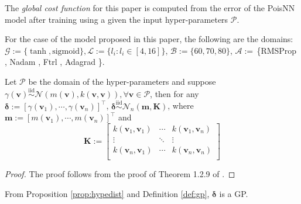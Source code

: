 \begin{remark}
    The \textit{global cost function} for this paper is computed from the error of the PoisNN model after training using a given the input hyper-parameters $\mathscr{P}$.
\end{remark}
\begin{remark}
    For the case of the model proposed in this paper, the following are the domains: $\mathscr{G}:=\{\tanh,\mathrm{sigmoid}\},\mathscr{L}:=\{l_i: l_i\in [4, 16]\}$, $\mathscr{B}:=\{60, 70, 80\}$, $\mathscr{A}:=$\,\{RMSProp \cite{hinton2012}, Nadam \cite{Dozat2016IncorporatingNM}, Ftrl \cite{ftrl}, Adagrad \cite{JMLR:adagrad}\}.
\end{remark}
\begin{prop}\label{prop:hypedist}
    Let $\mathscr{P}$ be the domain of the hyper-parameters and suppose $\gamma(\mathbf{v})\overset{\mathrm{iid}}{\sim}\mathcal{N}(m(\mathbf{v}),k(\mathbf{v},\mathbf{v})), \forall \mathbf{v}\in\mathscr{P}$, then for any $\boldsymbol{\delta}:=[\gamma(\mathbf{v}_1),\cdots,\gamma(\mathbf{v}_n)]^{\top}$, $\boldsymbol{\delta}\overset{\mathrm{iid}}{\sim}\mathcal{N}_n(\mathbf{m},\mathbf{K})$, where $\mathbf{m}:=[m(\mathbf{v}_1),\cdots,m(\mathbf{v}_n)]^{\top}$ and
    \begin{equation}
        \mathbf{K}:=\left[\begin{matrix}
        k(\mathbf{v}_1,\mathbf{v}_1)&\cdots&k(\mathbf{v}_1,\mathbf{v}_n)\\
        \vdots&\ddots&\vdots\\
        k(\mathbf{v}_n,\mathbf{v}_1)&\cdots&k(\mathbf{v}_n,\mathbf{v}_n)\\
        \end{matrix}\right]
    \end{equation}
\end{prop}
\begin{proof}
    The proof follows from the proof of Theorem 1.2.9 of .
\end{proof}
\begin{remark}
    From Proposition \ref{prop:hypedist} and Definition \ref{def:gp}, $\boldsymbol{\delta}$ is a GP.
\end{remark}
